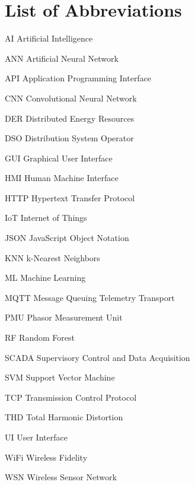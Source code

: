 

\chapter*{List of Abbreviations}
\thispagestyle{plain}

\begin{abbrv}
	\item[AI] Artificial Intelligence
	\item[ANN] Artificial Neural Network
	\item[API] Application Programming Interface
	\item[CNN] Convolutional Neural Network
	\item[DER] Distributed Energy Resources
	\item[DSO] Distribution System Operator
	\item[GUI] Graphical User Interface
	\item[HMI] Human Machine Interface
	\item[HTTP] Hypertext Transfer Protocol
	\item[IoT] Internet of Things
	\item[JSON] JavaScript Object Notation
	\item[KNN] k-Nearest Neighbors
	\item[ML] Machine Learning
	\item[MQTT] Message Queuing Telemetry Transport
	\item[PMU] Phasor Measurement Unit
	\item[RF] Random Forest
	\item[SCADA] Supervisory Control and Data Acquisition
	\item[SVM] Support Vector Machine
	\item[TCP] Transmission Control Protocol
	\item[THD] Total Harmonic Distortion
	\item[UI] User Interface
	\item[WiFi] Wireless Fidelity
	\item[WSN] Wireless Sensor Network
\end{abbrv}

\cleardoublepage